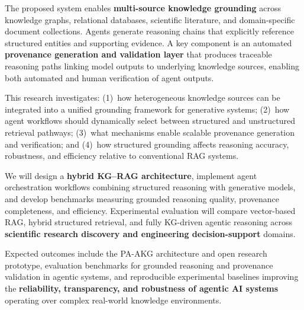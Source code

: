 \documentclass[conference, 10pt]{IEEEtran}
\begin{document}
The proposed system enables \textbf{multi-source knowledge grounding} across knowledge graphs, relational databases, scientific literature, and domain-specific document collections. Agents generate reasoning chains that explicitly reference structured entities and supporting evidence. A key component is an automated \textbf{provenance generation and validation layer} that produces traceable reasoning paths linking model outputs to underlying knowledge sources, enabling both automated and human verification of agent outputs.

This research investigates: (1)~how heterogeneous knowledge sources can be integrated into a unified grounding framework for generative systems; (2)~how agent workflows should dynamically select between structured and unstructured retrieval pathways; (3)~what mechanisms enable scalable provenance generation and verification; and (4)~how structured grounding affects reasoning accuracy, robustness, and efficiency relative to conventional RAG systems.

We will design a \textbf{hybrid KG--RAG architecture}, implement agent orchestration workflows combining structured reasoning with generative models, and develop benchmarks measuring grounded reasoning quality, provenance completeness, and efficiency. Experimental evaluation will compare vector-based RAG, hybrid structured retrieval, and fully KG-driven agentic reasoning across \textbf{scientific research discovery and engineering decision-support} domains.

Expected outcomes include the PA-AKG architecture and open research prototype, evaluation benchmarks for grounded reasoning and provenance validation in agentic systems, and reproducible experimental baselines improving the \textbf{reliability, transparency, and robustness of agentic AI systems} operating over complex real-world knowledge environments.



\end{document}
